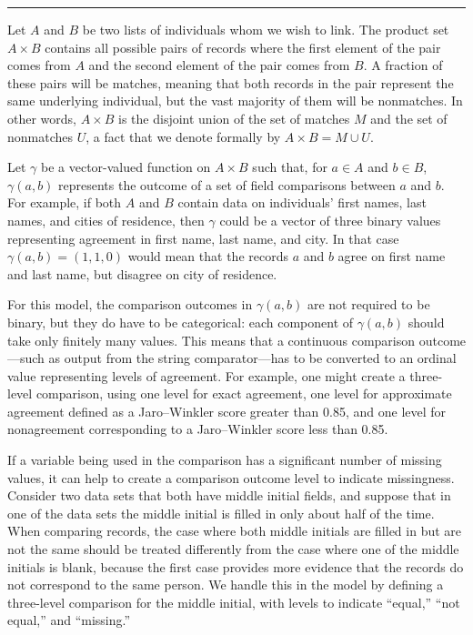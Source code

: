 \documentclass[]{krantz}
\begin{document}
\begin{center}\rule{0.5\linewidth}{\linethickness}\end{center}

Let \(A\) and \(B\) be two lists of individuals whom we wish to link.
The product set \(A \times B\) contains all possible pairs of records
where the first element of the pair comes from \(A\) and the second
element of the pair comes from \(B\). A fraction of these pairs will be
matches, meaning that both records in the pair represent the same
underlying individual, but the vast majority of them will be nonmatches.
In other words, \(A \times B\) is the disjoint union of the set of
matches \(M\) and the set of nonmatches \(U\), a fact that we denote
formally by \(A \times B = M \cup U\).

Let \(\gamma\) be a vector-valued function on \(A \times B\) such that,
for \(a \in A\) and \(b \in B\), \(\gamma(a, b)\) represents the outcome
of a set of field comparisons between \(a\) and \(b\). For example, if
both \(A\) and \(B\) contain data on individuals' first names, last
names, and cities of residence, then \(\gamma\) could be a vector of
three binary values representing agreement in first name, last name, and
city. In that case \(\gamma(a, b) = (1, 1, 0)\) would mean that the
records \(a\) and \(b\) agree on first name and last name, but disagree
on city of residence.

For this model, the comparison outcomes in \(\gamma(a, b)\) are not
required to be binary, but they do have to be categorical: each
component of \(\gamma(a, b)\) should take only finitely many values.
This means that a continuous comparison outcome---such as output from
the string comparator---has to be converted to an ordinal value
representing levels of agreement. For example, one might create a
three-level comparison, using one level for exact agreement, one level
for approximate agreement defined as a Jaro--Winkler score greater than
0.85, and one level for nonagreement corresponding to a Jaro--Winkler
score less than 0.85.

If a variable being used in the comparison has a significant number of
missing values, it can help to create a comparison outcome level to
indicate missingness. Consider two data sets that both have middle
initial fields, and suppose that in one of the data sets the middle
initial is filled in only about half of the time. When comparing
records, the case where both middle initials are filled in but are not
the same should be treated differently from the case where one of the
middle initials is blank, because the first case provides more evidence
that the records do not correspond to the same person. We handle this in
the model by defining a three-level comparison for the middle initial,
with levels to indicate ``equal,'' ``not equal,'' and ``missing.''
\end{document}
